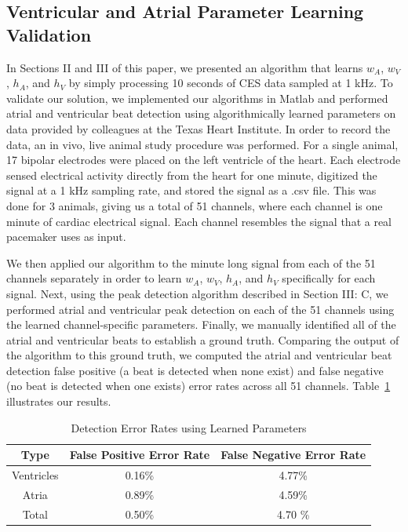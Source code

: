 \documentclass[conference]{IEEEtran}
\newcommand{\APW}{\ensuremath{w_A}}
\newcommand{\VPW}{\ensuremath{w_V}}
\newcommand{\APH}{\ensuremath{h_A}}
\newcommand{\VPH}{\ensuremath{h_V}}
\begin{document}
\subsection{Ventricular and Atrial Parameter Learning Validation}
In Sections II and III of this paper, we presented an
algorithm that learns \APW{}, \VPW{}, \APH{}, and \VPH{} by
simply processing 10 seconds of CES data sampled at 1
kHz. To validate our solution, we implemented our algorithms in
Matlab and performed atrial and ventricular beat
detection using algorithmically learned parameters on
data provided by colleagues at the Texas Heart Institute.
In order to record the data, an in vivo,
live animal study procedure was performed. For a single
animal, 17 bipolar electrodes were placed on the left ventricle
of the heart. Each electrode sensed electrical activity
directly from the heart for one minute, digitized the
signal at a 1 kHz sampling rate, and stored the signal as
a .csv file. This was done for 3 animals, giving us a total
of 51 channels, where each channel is one minute of cardiac electrical signal.
Each channel resembles the signal that a real pacemaker uses as input.

We then applied our algorithm to the minute long signal
from each of the 51 channels separately in order to learn
\APW{}, \VPW{}, \APH{}, and \VPH{} specifically for each
signal. Next, using the peak detection algorithm
described in Section III: C, we performed atrial and
ventricular peak detection on each of the 51 channels
using the learned channel-specific parameters.
Finally, we manually identified all of the atrial and ventricular beats to establish a ground truth. 
Comparing the output of the algorithm to this ground truth, we computed the
atrial and ventricular beat detection 
false positive (a beat is detected when none
exist) and false negative (no beat is detected when one
exists) error rates across all 51 channels.
Table~\ref{tab:errors} illustrates our results.
\begin{table}[h]
	\caption{Detection Error Rates using Learned Parameters}
	\label{tab:errors}
	\centering
	\begin{tabular}{|c|c|c|}
		\hline
		Type & False Positive Error Rate & False Negative Error Rate \\
		\hline 
		Ventricles & 0.16\% &4.77\% \\
		\hline
		Atria & 0.89\% & 4.59\% \\
		\hline
		Total & 0.50\% & 4.70 \% \\
		\hline
	\end{tabular}
\end{table}
\end{document}
